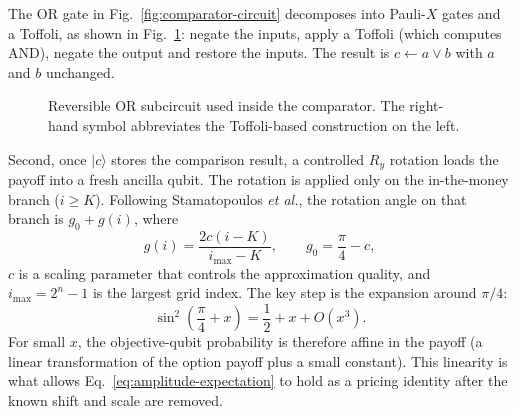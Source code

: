 \documentclass[12pt]{article}
\begin{document}
The OR gate in Fig.~\ref{fig:comparator-circuit} decomposes into Pauli-$X$ gates and a Toffoli, as shown in Fig.~\ref{fig:or-gate}: negate the inputs, apply a Toffoli (which computes AND), negate the output and restore the inputs.  The result is $c \leftarrow a \lor b$ with $a$ and $b$ unchanged.

\begin{figure}[H]
    \centering
    \caption{Reversible OR subcircuit used inside the comparator.  The right-hand symbol abbreviates the Toffoli-based construction on the left.}
    \label{fig:or-gate}
\end{figure}

Second, once $\lvert c\rangle$ stores the comparison result, a controlled $R_y$ rotation loads the payoff into a fresh ancilla qubit.  The rotation is applied only on the in-the-money branch ($i\ge K$).  Following Stamatopoulos \textit{et al.}, the rotation angle on that branch is $g_0+g(i)$, where
\begin{equation}
    g(i)=\frac{2c(i-K)}{i_{\max}-K},
    \qquad
    g_0=\frac{\pi}{4}-c,
    \label{eq:stamatopoulos-payoff-angles}
\end{equation}
$c$ is a scaling parameter that controls the approximation quality, and $i_{\max}=2^n-1$ is the largest grid index.  The key step is the expansion around $\pi/4$:
\begin{equation}
    \sin^2\!\left(\frac{\pi}{4}+x\right)
    =
    \frac{1}{2}+x+O(x^3).
\end{equation}
For small $x$, the objective-qubit probability is therefore affine in the payoff (a linear transformation of the option payoff plus a small constant).  This linearity is what allows Eq.~\eqref{eq:amplitude-expectation} to hold as a pricing identity after the known shift and scale are removed.
\end{document}

